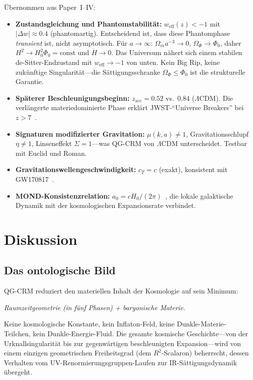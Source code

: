 \documentclass[aps,prd,twocolumn,superscriptaddress,nofootinbib]{revtex4-2}
\begin{document}
Übernommen aus Paper~I--IV:
\begin{itemize}
\item \textbf{Zustandsgleichung und Phantomstabilität:} $w_\mathrm{eff}(z) < -1$ mit $|\Delta w| \approx 0.4$ (phantomartig). Entscheidend ist, dass diese Phantomphase \textit{transient} ist, nicht asymptotisch. Für $a \to \infty$: $\Omega_m a^{-3} \to 0$, $\Omega_\Phi \to \Phi_0$, daher $H^2 \to H_0^2\Phi_0 = \mathrm{const}$ und $\dot{H} \to 0$. Das Universum nähert sich einem stabilen de-Sitter-Endzustand mit $w_\mathrm{eff} \to -1$ von unten. Kein Big Rip, keine zukünftige Singularität---die Sättigungsschranke $\Omega_\Phi \leq \Phi_0$ ist die strukturelle Garantie.
\item \textbf{Späterer Beschleunigungsbeginn:} $z_\mathrm{acc} = 0.52$ vs.\ $0.84$ ($\Lambda$CDM). Die verlängerte materiedominierte Phase erklärt JWST-``Universe Breakers'' bei $z > 7$~\cite{Labbe2023}.
\item \textbf{Signaturen modifizierter Gravitation:} $\mu(k,a) \neq 1$, Gravitationsschlupf $\eta \neq 1$, Linseneffekt $\Sigma = 1$---was QG-CRM von $\Lambda$CDM unterscheidet. Testbar mit Euclid und Roman.
\item \textbf{Gravitationswellengeschwindigkeit:} $c_T = c$ (exakt), konsistent mit GW170817~\cite{GW170817}.
\item \textbf{MOND-Konsistenzrelation:} $a_0 = cH_0/(2\pi)$~\cite{Milgrom1983}, die lokale galaktische Dynamik mit der kosmologischen Expansionsrate verbindet.
\end{itemize}


\section{Diskussion}
\label{sec:discussion}

\subsection{Das ontologische Bild}

QG-CRM reduziert den materiellen Inhalt der Kosmologie auf sein Minimum:
\begin{center}
\textit{Raumzeitgeometrie (in fünf Phasen) + baryonische Materie.}
\end{center}
Keine kosmologische Konstante, kein Inflaton-Feld, keine Dunkle-Materie-Teilchen, kein Dunkle-Energie-Fluid. Die gesamte kosmische Geschichte---von der Urknallsingularität bis zur gegenwärtigen beschleunigten Expansion---wird von einem einzigen geometrischen Freiheitsgrad (dem $R^2$-Scalaron) beherrscht, dessen Verhalten vom UV-Renormierungsgruppen-Laufen zur IR-Sättigungsdynamik übergeht.
\end{document}
